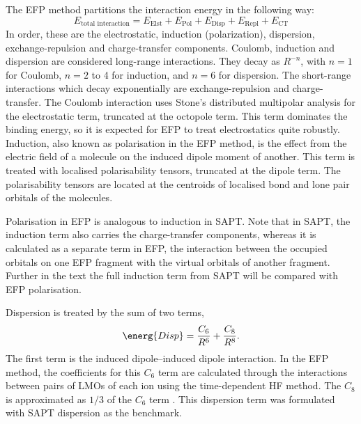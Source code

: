 The EFP method partitions the interaction energy in the following way:
\begin{equation*}
    E_{\text{total interaction}} = E_{\text{Elst}} + E_{\text{Pol}} + E_{\text{Disp}} + 
                                    E_{\text{Repl}} + E_{\text{CT}}
\end{equation*}
In order, these are the electrostatic, induction (polarization), dispersion, exchange-repulsion and charge-transfer components.
Coulomb, induction and dispersion are considered long-range interactions.
They decay as $R^{-n}$, with $n = 1$ for Coulomb, $n = 2$ to 4 for induction, and $n = 6$ for dispersion.
The short-range interactions which decay exponentially are exchange-repulsion and charge-transfer.
The Coulomb interaction uses Stone's distributed multipolar analysis 
\cite{Stone1996a} 
for the electrostatic term, truncated at the octopole term.
This term dominates the binding energy, so it is expected for EFP to treat electrostatics quite robustly.
Induction, also known as polarisation in the EFP method, is the effect from the electric field of a molecule on the induced dipole moment of another.
This term is treated with localised polarisability tensors, truncated at the dipole term.
The polarisability tensors are located at the centroids of localised bond and lone pair orbitals of the molecules.
\cite{Li2006a}


Polarisation in EFP is analogous to induction in SAPT. 
Note that in SAPT, the induction term also carries the charge-transfer components, whereas it is calculated as a separate term in EFP, the interaction between the occupied orbitals on one EFP fragment with the virtual orbitals of another fragment.
Further in the text the full induction term from SAPT will be compared with EFP polarisation.


Dispersion is treated by the sum of two terms,
\begin{equation}
    \energ{Disp} = \frac{C_6}{R^6} + \frac{C_8}{R^8}.
\end{equation}
The first term is the induced dipole--induced dipole interaction.
In the EFP method, the coefficients for this $C_6$ term are calculated through the interactions between pairs of LMOs of each ion using the time-dependent HF method.
The $C_8$ is approximated as $1/3$ of the $C_6$ term
\cite{Adamovic2005a}.
This dispersion term was formulated with SAPT dispersion as the benchmark.


